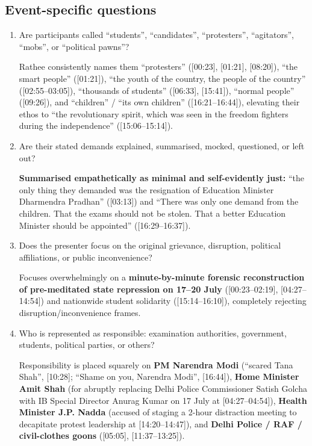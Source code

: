 \documentclass[10pt,a4paper]{article}
\begin{document}
\subsection*{Event-specific questions}
{\small
\begin{enumerate}[leftmargin=1.5em, itemsep=6pt, topsep=4pt]
  \item Are participants called ``students'', ``candidates'', ``protesters'', ``agitators'', ``mobs'', or ``political pawns''?\par\smallskip
  Rathee consistently names them ``protesters'' ([00:23], [01:21], [08:20]), ``the smart people'' ([01:21]), ``the youth of the country, the people of the country'' ([02:55--03:05]), ``thousands of students'' ([06:33], [15:41]), ``normal people'' ([09:26]), and ``children'' / ``its own children'' ([16:21--16:44]), elevating their ethos to ``the revolutionary spirit, which was seen in the freedom fighters during the independence'' ([15:06--15:14]).
  \item Are their stated demands explained, summarised, mocked, questioned, or left out?\par\smallskip
  \textbf{Summarised empathetically as minimal and self-evidently just:} ``the only thing they demanded was the resignation of Education Minister Dharmendra Pradhan'' ([03:13]) and ``There was only one demand from the children. That the exams should not be stolen. That a better Education Minister should be appointed'' ([16:29--16:37]).
  \item Does the presenter focus on the original grievance, disruption, political affiliations, or public inconvenience?\par\smallskip
  Focuses overwhelmingly on a \textbf{minute-by-minute forensic reconstruction of pre-meditated state repression on 17--20 July} ([00:23--02:19], [04:27--14:54]) and nationwide student solidarity ([15:14--16:10]), completely rejecting disruption/inconvenience frames.
  \item Who is represented as responsible: examination authorities, government, students, political parties, or others?\par\smallskip
  Responsibility is placed squarely on \textbf{PM Narendra Modi} (``scared Tana Shah'', [10:28]; ``Shame on you, Narendra Modi'', [16:44]), \textbf{Home Minister Amit Shah} (for abruptly replacing Delhi Police Commissioner Satish Golcha with IB Special Director Anurag Kumar on 17 July at [04:27--04:54]), \textbf{Health Minister J.P. Nadda} (accused of staging a 2-hour distraction meeting to decapitate protest leadership at [14:20--14:47]), and \textbf{Delhi Police / RAF / civil-clothes goons} ([05:05], [11:37--13:25]).

\end{enumerate}}
\end{document}
